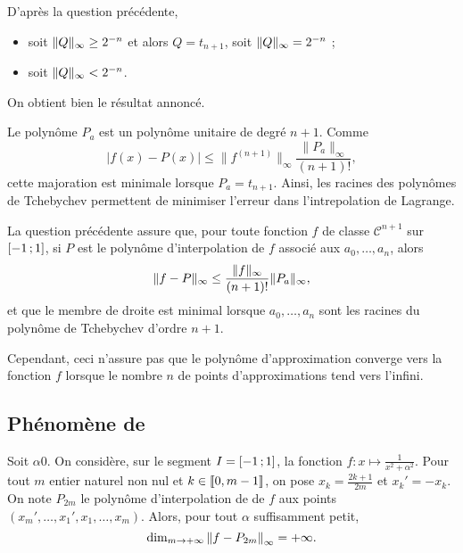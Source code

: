 \begin{solution}
\begin{reponses}
\item D'après la question précédente,
\begin{itemize}
\item soit $\Vert Q \Vert_\infty \geq 2^{-n}$ et alors $Q = t_{n+1}$, soit $\Vert Q \Vert_\infty = 2^{-n}$ ;
\item soit $\Vert Q \Vert_\infty < 2^{-n}$.
\end{itemize}
On obtient bien le résultat annoncé.

\item Le polynôme $P_a$ est un polynôme unitaire de degré $n+1$. Comme
\[
|f(x) - P(x)| \leq \|f^{(n+1)}\|_\infty \frac{\|P_a\|_\infty}{(n+1)!},
\]
cette majoration est minimale lorsque $P_a = t_{n+1}$. Ainsi, les racines des polynômes de Tchebychev permettent de minimiser l'erreur dans l'intrepolation de Lagrange.
\end{reponses}
\end{solution}

\begin{remarque}
La question précédente assure que, pour toute fonction $f$ de classe $\mathscr{C}^{n+1}$ sur $\left[-1\,;1\right]$, si $P$ est le polynôme d'interpolation de $f$ associé aux $a_0,\ldots,a_n$, alors
\[
\Vert f - P \Vert_{\infty} \leq \frac{\Vert f \Vert_\infty}{(n+1)!} \Vert P_a \Vert_{\infty},
\]
et que le membre de droite est minimal lorsque $a_0,\ldots,a_n$ sont les racines du polynôme de Tchebychev d'ordre $n + 1$.

Cependant, ceci n'assure pas que le polynôme d'approximation converge vers la fonction $f$ lorsque le nombre $n$ de points d'approximations tend vers l'infini.
\end{remarque}

\subsection{Phénomène de }


\begin{prop}{}{}
Soit $\alpha  0$. On considère, sur le segment $I = \left[-1\,;1\right]$, la fonction $f : x \mapsto \frac{1}{x^2 + \alpha^2}$. Pour tout $m$ entier naturel non nul et $k \in \llbracket0,m-1\rrbracket$, on pose $x_k = \frac{2 k + 1}{2 m}$ et $x_k' = - x_k$. On note $P_{2m}$ le polynôme d'interpolation de  de $f$ aux points $(x_m',\ldots,x_1',x_1,\ldots,x_m)$. Alors, pour tout $\alpha$ suffisamment petit,
\[
\dim_{m\to+\infty} \norm{f - P_{2m}}_\infty = +\infty.
\]
\end{prop}

